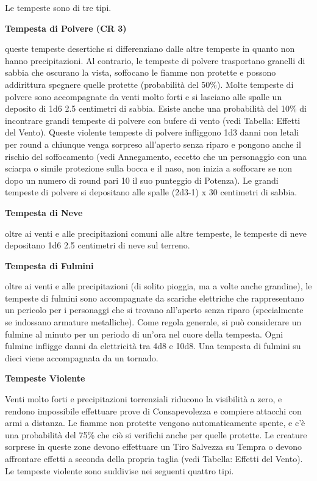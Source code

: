 \documentclass[a4paper,11pt,twoside,openany]{book}
\begin{document}
Le tempeste sono di tre tipi.

\textbf{Tempesta di Polvere (CR 3)}

queste tempeste desertiche si differenziano dalle altre tempeste in quanto non hanno precipitazioni. Al contrario, le tempeste di polvere trasportano granelli di sabbia che oscurano la vista, soffocano le fiamme non protette e possono addirittura spegnere quelle protette (probabilità del 50\%). Molte tempeste di polvere sono accompagnate da venti molto forti e si lasciano alle spalle un deposito di 1d6 \texttimes{} 2.5 centimetri di sabbia.
Esiste anche una probabilità del 10\% di incontrare grandi tempeste di polvere con bufere di vento (vedi Tabella: Effetti del Vento). Queste violente tempeste di polvere infliggono 1d3 danni non letali per round a chiunque venga sorpreso all'aperto senza riparo e pongono anche il rischio del soffocamento (vedi Annegamento, eccetto che un personaggio con una sciarpa o simile protezione sulla bocca e il naso, non inizia a soffocare se non dopo un numero di round pari 10 \texttimes{} il suo punteggio di Potenza). Le grandi tempeste di polvere si depositano alle spalle (2d3-1) x 30 centimetri di sabbia.

\textbf{Tempesta di Neve}

oltre ai venti e alle precipitazioni comuni alle altre tempeste, le tempeste di neve depositano 1d6 \texttimes{} 2.5 centimetri di neve sul terreno.

\textbf{Tempesta di Fulmini}

oltre ai venti e alle precipitazioni (di solito pioggia, ma a volte anche grandine), le tempeste di fulmini sono accompagnate da scariche elettriche che rappresentano un pericolo per i personaggi che si trovano all'aperto senza riparo (specialmente se indossano armature metalliche). Come regola generale, si può considerare un fulmine al minuto per un periodo di un'ora nel cuore della tempesta. Ogni fulmine infligge danni da elettricità tra 4d8 e 10d8. Una tempesta di fulmini su dieci viene accompagnata da un tornado.

\textbf{Tempeste Violente}

Venti molto forti e precipitazioni torrenziali riducono la visibilità a zero, e rendono impossibile effettuare prove di Consapevolezza e compiere attacchi con armi a distanza. Le fiamme non protette vengono automaticamente spente, e c'è una probabilità del 75\% che ciò si verifichi anche per quelle protette. Le creature sorprese in queste zone devono effettuare un Tiro Salvezza su Tempra o devono affrontare effetti a seconda della propria taglia (vedi Tabella: Effetti del Vento). Le tempeste violente sono suddivise nei seguenti quattro tipi.
\end{document}
